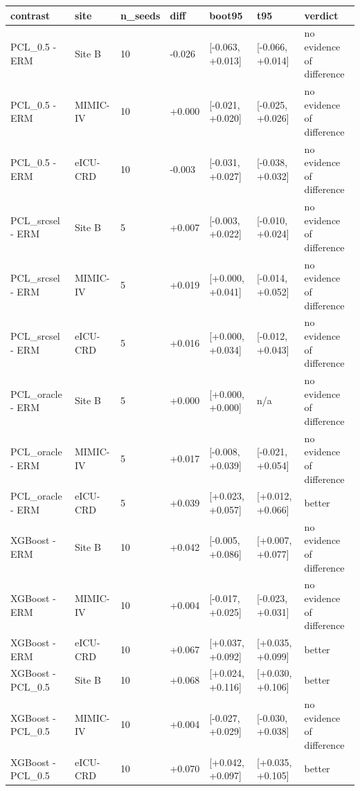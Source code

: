 \begin{tabular}{lllllll}
\hline
contrast & site & n\_seeds & diff & boot95 & t95 & verdict \\
\hline
PCL\_0.5 - ERM & Site B & 10 & -0.026 & [-0.063, +0.013] & [-0.066, +0.014] & no evidence of difference \\
PCL\_0.5 - ERM & MIMIC-IV & 10 & +0.000 & [-0.021, +0.020] & [-0.025, +0.026] & no evidence of difference \\
PCL\_0.5 - ERM & eICU-CRD & 10 & -0.003 & [-0.031, +0.027] & [-0.038, +0.032] & no evidence of difference \\
PCL\_srcsel - ERM & Site B & 5 & +0.007 & [-0.003, +0.022] & [-0.010, +0.024] & no evidence of difference \\
PCL\_srcsel - ERM & MIMIC-IV & 5 & +0.019 & [+0.000, +0.041] & [-0.014, +0.052] & no evidence of difference \\
PCL\_srcsel - ERM & eICU-CRD & 5 & +0.016 & [+0.000, +0.034] & [-0.012, +0.043] & no evidence of difference \\
PCL\_oracle - ERM & Site B & 5 & +0.000 & [+0.000, +0.000] & n/a & no evidence of difference \\
PCL\_oracle - ERM & MIMIC-IV & 5 & +0.017 & [-0.008, +0.039] & [-0.021, +0.054] & no evidence of difference \\
PCL\_oracle - ERM & eICU-CRD & 5 & +0.039 & [+0.023, +0.057] & [+0.012, +0.066] & better \\
XGBoost - ERM & Site B & 10 & +0.042 & [-0.005, +0.086] & [+0.007, +0.077] & no evidence of difference \\
XGBoost - ERM & MIMIC-IV & 10 & +0.004 & [-0.017, +0.025] & [-0.023, +0.031] & no evidence of difference \\
XGBoost - ERM & eICU-CRD & 10 & +0.067 & [+0.037, +0.092] & [+0.035, +0.099] & better \\
XGBoost - PCL\_0.5 & Site B & 10 & +0.068 & [+0.024, +0.116] & [+0.030, +0.106] & better \\
XGBoost - PCL\_0.5 & MIMIC-IV & 10 & +0.004 & [-0.027, +0.029] & [-0.030, +0.038] & no evidence of difference \\
XGBoost - PCL\_0.5 & eICU-CRD & 10 & +0.070 & [+0.042, +0.097] & [+0.035, +0.105] & better \\
\hline
\end{tabular}
